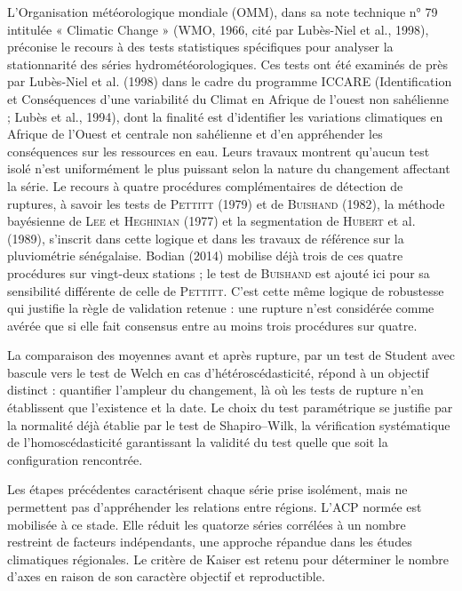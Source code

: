 \documentclass[12pt,a4paper]{report}
\begin{document}
L’Organisation météorologique mondiale (OMM), dans sa note technique n° 79 intitulée « Climatic Change » (WMO, 1966, cité par Lubès-Niel et al., 1998), préconise le recours à des tests statistiques spécifiques pour analyser la stationnarité des séries hydrométéorologiques. Ces tests ont été examinés de près par Lubès-Niel et al. (1998) dans le cadre du programme ICCARE (Identification et Conséquences d’une variabilité du Climat en Afrique de l’ouest non sahélienne ; Lubès et al., 1994), dont la finalité est d’identifier les variations climatiques en Afrique de l’Ouest et centrale non sahélienne et d’en appréhender les conséquences sur les ressources en eau. Leurs travaux montrent qu’aucun test isolé n’est uniformément le plus puissant selon la nature du changement affectant la série. Le recours à quatre procédures complémentaires de détection de ruptures, à savoir les tests de \textsc{Pettitt} (1979) et de \textsc{Buishand} (1982), la méthode bayésienne de \textsc{Lee} et \textsc{Heghinian} (1977) et la segmentation de \textsc{Hubert} et al. (1989), s’inscrit dans cette logique et dans les travaux de référence sur la pluviométrie sénégalaise. Bodian (2014) mobilise déjà trois de ces quatre procédures sur vingt-deux stations ; le test de \textsc{Buishand} est ajouté ici pour sa sensibilité différente de celle de \textsc{Pettitt}. C’est cette même logique de robustesse qui justifie la règle de validation retenue : une rupture n’est considérée comme avérée que si elle fait consensus entre au moins trois procédures sur quatre.

La comparaison des moyennes avant et après rupture, par un test de Student avec bascule vers le test de Welch en cas d'hétéroscédasticité, répond à un objectif distinct : quantifier l'ampleur du changement, là où les tests de rupture n'en établissent que l'existence et la date. Le choix du test paramétrique se justifie par la normalité déjà établie par le test de Shapiro--Wilk, la vérification systématique de l'homoscédasticité garantissant la validité du test quelle que soit la configuration rencontrée.

Les étapes précédentes caractérisent chaque série prise isolément, mais ne permettent pas d'appréhender les relations entre régions. L'ACP normée est mobilisée à ce stade. Elle réduit les quatorze séries corrélées à un nombre restreint de facteurs indépendants, une approche répandue dans les études climatiques régionales. Le critère de Kaiser est retenu pour déterminer le nombre d'axes en raison de son caractère objectif et reproductible.
\end{document}
